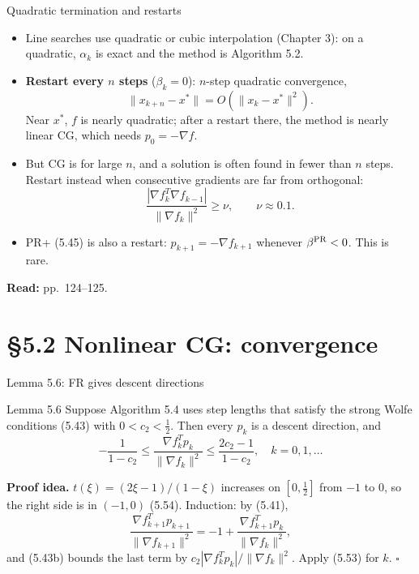 \documentclass[12pt,aspectratio=169]{beamer}
\newcommand{\readpp}[1]{{\color{red!80!black}\textbf{Read:} #1}}
\begin{document}
\begin{frame}{Quadratic termination and restarts}
  \begin{itemize}
    \item Line searches use quadratic or cubic interpolation (Chapter 3): on a quadratic, $\alpha_k$ is exact and the method is Algorithm 5.2.
    \item \textbf{Restart every $n$ steps} ($\beta_k=0$): $n$-step quadratic convergence,
      \begin{equation}
        \|x_{k+n}-x^*\| = O(\|x_k-x^*\|^2). \tag{5.51}
      \end{equation}
      Near $x^*$, $f$ is nearly quadratic; after a restart there, the method is nearly linear CG, which needs $p_0=-\nabla f$.
    \item But CG is for large $n$, and a solution is often found in fewer than $n$ steps. Restart instead when consecutive gradients are far from orthogonal:
      \begin{equation}
        \frac{|\nabla f_k^T\nabla f_{k-1}|}{\|\nabla f_k\|^2}\ge\nu, \qquad \nu\approx0.1. \tag{5.52}
      \end{equation}
    \item PR+ (5.45) is also a restart: $p_{k+1}=-\nabla f_{k+1}$ whenever $\beta^{\rm PR}<0$. This is rare.
  \end{itemize}
  \readpp{pp.~124--125.}
\end{frame}

\section{\S5.2 Nonlinear CG: convergence}

\begin{frame}{Lemma 5.6: FR gives descent directions}
  \begin{block}{Lemma 5.6}
    Suppose Algorithm 5.4 uses step lengths that satisfy the strong Wolfe conditions (5.43) with $0<c_2<\tfrac12$.
    Then every $p_k$ is a descent direction, and
    \begin{equation}
      -\frac{1}{1-c_2} \le \frac{\nabla f_k^Tp_k}{\|\nabla f_k\|^2} \le \frac{2c_2-1}{1-c_2}, \quad k=0,1,\dots \tag{5.53}
    \end{equation}
  \end{block}
  \textbf{Proof idea.} $t(\xi)=(2\xi-1)/(1-\xi)$ increases on $[0,\tfrac12]$ from $-1$ to $0$, so the right side is in $(-1,0)$ (5.54).
  Induction: by (5.41),
  \begin{equation}
    \frac{\nabla f_{k+1}^Tp_{k+1}}{\|\nabla f_{k+1}\|^2} = -1+\frac{\nabla f_{k+1}^Tp_k}{\|\nabla f_k\|^2}, \tag{5.55}
  \end{equation}
  and (5.43b) bounds the last term by $c_2|\nabla f_k^Tp_k|/\|\nabla f_k\|^2$. Apply (5.53) for $k$. \hfill$\square$
\end{frame}
\end{document}
